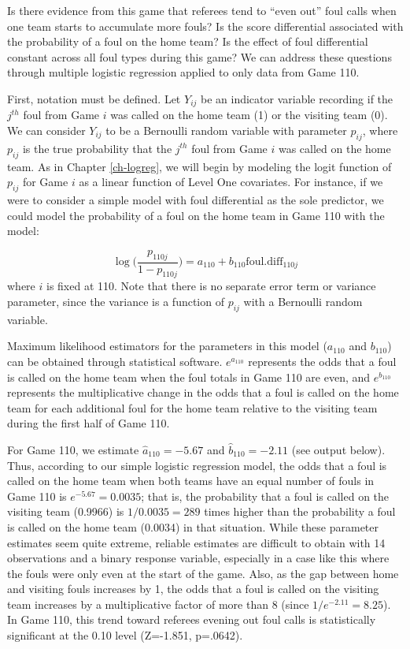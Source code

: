 \documentclass[
]{krantz}
\begin{document}
Is there evidence from this game that referees tend to ``even out'' foul calls when one team starts to accumulate more fouls? Is the score differential associated with the probability of a foul on the home team? Is the effect of foul differential constant across all foul types during this game? We can address these questions through multiple logistic regression applied to only data from Game 110.

First, notation must be defined. Let \(Y_{ij}\) be an indicator variable recording if the \(j^{th}\) foul from Game \(i\) was called on the home team (1) or the visiting team (0). We can consider \(Y_{ij}\) to be a Bernoulli random variable with parameter \(p_{ij}\), where \(p_{ij}\) is the true probability that the \(j^{th}\) foul from Game \(i\) was called on the home team. As in Chapter \ref{ch-logreg}, we will begin by modeling the logit function of \(p_{ij}\) for Game \(i\) as a linear function of Level One covariates. For instance, if we were to consider a simple model with foul differential as the sole predictor, we could model the probability of a foul on the home team in Game 110 with the model:

\begin{equation}
\log\bigg(\frac{p_{110j}}{1-p_{110j}}\bigg)=a_{110}+b_{110}\mathrm{foul.diff}_{110j}
\label{eq:lev1glmm}
\end{equation}
where \(i\) is fixed at 110. Note that there is no separate error term or variance parameter, since the variance is a function of \(p_{ij}\) with a Bernoulli random variable.

Maximum likelihood estimators for the parameters in this model (\(a_{110}\) and \(b_{110}\)) can be obtained through statistical software. \(e^{a_{110}}\) represents the odds that a foul is called on the home team when the foul totals in Game 110 are even, and \(e^{b_{110}}\) represents the multiplicative change in the odds that a foul is called on the home team for each additional foul for the home team relative to the visiting team during the first half of Game 110.

For Game 110, we estimate \(\hat{a}_{110}=-5.67\) and \(\hat{b}_{110}=-2.11\) (see output below). Thus, according to our simple logistic regression model, the odds that a foul is called on the home team when both teams have an equal number of fouls in Game 110 is \(e^{-5.67}=0.0035\); that is, the probability that a foul is called on the visiting team (0.9966) is \(1/0.0035 = 289\) times higher than the probability a foul is called on the home team (0.0034) in that situation. While these parameter estimates seem quite extreme, reliable estimates are difficult to obtain with 14 observations and a binary response variable, especially in a case like this where the fouls were only even at the start of the game. Also, as the gap between home and visiting fouls increases by 1, the odds that a foul is called on the visiting team increases by a multiplicative factor of more than 8 (since \(1/e^{-2.11}=8.25\)). In Game 110, this trend toward referees evening out foul calls is statistically significant at the 0.10 level (Z=-1.851, p=.0642).
\end{document}
